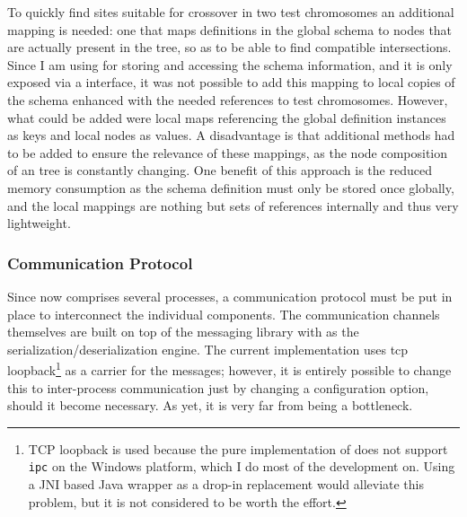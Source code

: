 To quickly find sites suitable for crossover in two test chromosomes an additional mapping is needed: 
one that maps definitions in the global schema to nodes that are actually present in the \xml tree, so 
as to be able to find compatible intersections.
Since I am using \xerces for storing and accessing the schema information, and it is only exposed via 
a \java interface, it was not possible to add this mapping to local copies of the schema  
enhanced with the needed references to test chromosomes. However, what could be added were local 
maps referencing the global definition instances as keys and local nodes as values. A disadvantage 
is that additional methods had to be added to ensure the relevance of these mappings, 
as the node composition of an \xml tree is constantly changing. 
One benefit of this approach is the reduced memory consumption as the schema
definition must only be stored once globally, and the local mappings are nothing but sets of references 
internally and thus very lightweight.
\subsubsection{Communication Protocol}
\label{sec:proto}
Since \xmlmate now comprises several processes, a communication protocol must be put in place to 
interconnect the individual components. The communication channels themselves are built on top of
the \zmq messaging library with \msgpack as the serialization/deserialization engine. The current
implementation uses tcp loopback\footnote{TCP loopback is used because the pure \java implementation 
of \zmq does not support \texttt{ipc} on the Windows platform, which I do most of the development on.
Using a JNI based Java wrapper as a drop-in replacement would alleviate this problem, 
but it is not considered to be worth the effort.} 
as a carrier for the messages; however, it is entirely possible
to change this to inter-process communication just by changing a configuration option, should it 
become necessary. As yet, it is very far from being a bottleneck.


